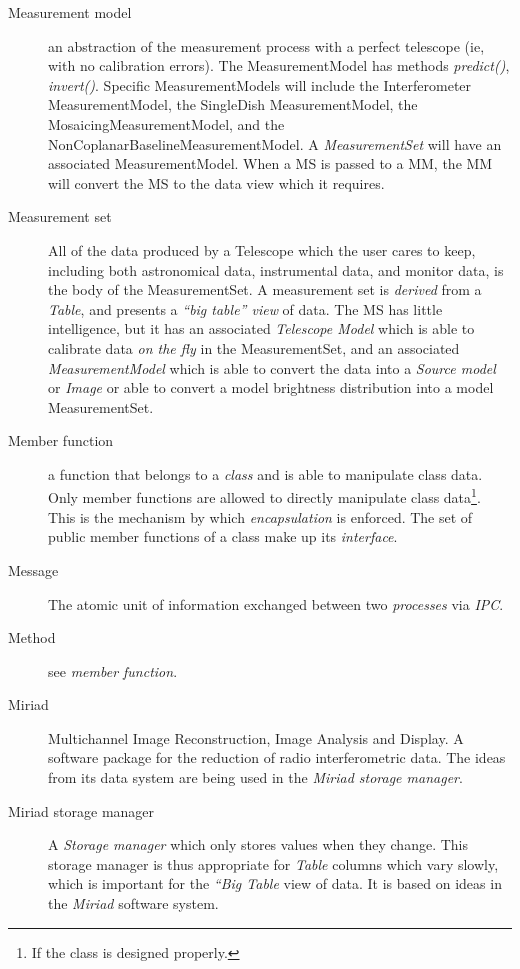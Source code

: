 \begin{description}
\item[Measurement model]
an abstraction of the measurement process with a perfect telescope
(ie, with no calibration errors).  The MeasurementModel has methods
{\em predict()}, {\em invert()}.  Specific MeasurementModels will
include the Interferometer MeasurementModel, the SingleDish
MeasurementModel, the MosaicingMeasurementModel, and the
NonCoplanarBaselineMeasurementModel.  A {\em MeasurementSet} will have
an associated MeasurementModel.  When a MS is passed to a MM, the MM
will convert the MS to the data view which it requires.


\item[Measurement set]
All of the data produced by a Telescope which the user cares to keep,
including both astronomical data, instrumental data, and monitor data,
is the body of the MeasurementSet. A measurement set is {\em derived}
from a {\em Table}, and presents a {\em ``big table'' view} of
data. The MS has little intelligence, but it has an associated {\em
Telescope Model} which is able to calibrate data {\em on the fly} in
the MeasurementSet, and an associated {\em MeasurementModel} which is
able to convert the data into a {\em Source model} or {\em Image} or
able to convert a model brightness distribution into a model
MeasurementSet.


\item[Member function] a function that belongs to a {\em class} and is able
to manipulate class data. Only member functions are allowed to
directly manipulate class data\footnote{If the class is designed
properly.}. This is the mechanism by which {\em encapsulation} is
enforced. The set of public member functions of a class make up its
{\em interface}.


\item[Message]
The atomic unit of information exchanged between two {\em processes}
via {\em IPC}.

\item[Method] see {\em member function}.

\item[Miriad]
Multichannel Image Reconstruction, Image Analysis and Display. A
software package for the reduction of radio interferometric data. The
ideas from its data system are being used in the {\em Miriad storage
manager}.

\item[Miriad storage manager]
A {\em Storage manager} which only stores values when they
change. This storage manager is thus appropriate for {\em Table}
columns which vary slowly, which is important for the {\em ``Big
Table} view of data. It is based on ideas in the {\em Miriad} software
system.


\end{description}
